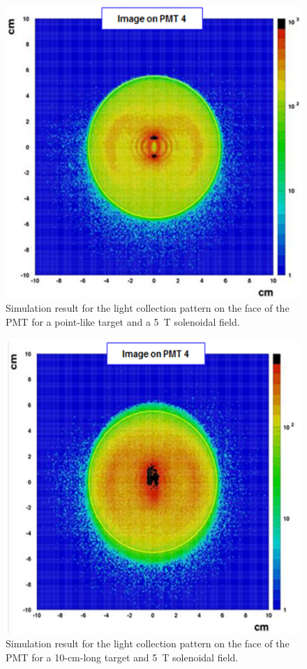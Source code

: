 \begin{figure}[!ht]
    \centering
    \includegraphics[width=1.0\linewidth,trim={0.0cm 0.0cm 0.0cm 0.0cm},clip]{images/Point_Targ_5T_Field_PMT.png}
    \caption{Simulation result for the light collection pattern on the face of the PMT for a point-like target and a 5~T
      solenoidal field.}
    \label{fig:Point_Targ_5T_Field_PMT}
\end{figure}

\begin{figure}[!ht]
    \centering
    \includegraphics[width=1.0\linewidth,trim={0.0cm 0.0cm 0.0cm 0.0cm},clip]{images/10cm_Targ_5T_Field_PMT.png}
    \caption{Simulation result for the light collection pattern on the face of the PMT for a 10-cm-long target and 5~T
      solenoidal field.}
    \label{fig:10cm_Targ_5T_Field_PMT}
\end{figure}

